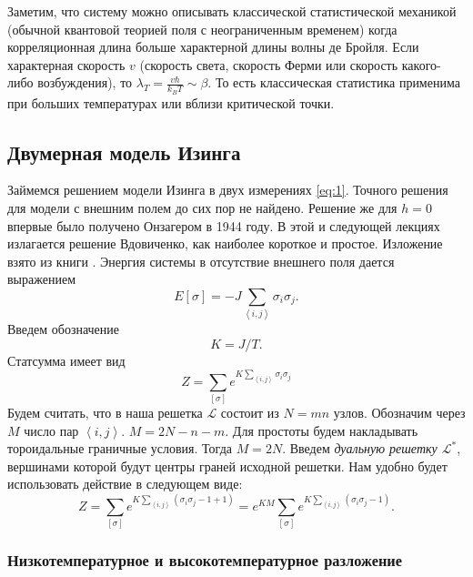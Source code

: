 \documentclass[a4paper,12pt]{article} \usepackage[utf8x]{inputenc} \usepackage[russian]{babel}
\theoremstyle{definition} \newtheorem{corollary}{Corollary}[theorem] \theoremstyle{definition}
\begin{document}
Заметим, что систему можно описывать классической статистической механикой (обычной квантовой
теорией поля с неограниченным временем) когда корреляционная длина больше характерной длины волны де
Бройля. Если характерная скорость $v$ (скорость света, скорость Ферми или скорость какого-либо
возбуждения), то $\lambda_T=\frac{v\hbar}{k_B T}\sim \beta$. То есть классическая статистика
применима при больших температурах или вблизи критической точки. %

\subsection{Двумерная модель Изинга}
\label{sec:ising2d}

Займемся решением модели Изинга в двух измерениях \eqref{eq:1}. Точного решения для модели с внешним
полем до сих пор не найдено. Решение же для $h=0$ впервые было получено Онзагером в 1944 году. В
этой и следующей лекциях излагается решение Вдовиченко, как наиболее короткое и простое. Изложение
взято из книги \cite{belavin2001lect}. Энергия системы в отсутствие внешнего поля дается выражением
\begin{equation}
  \label{eq:98} E[\sigma]=-J\sum_{\left<i,j\right>}\sigma_i \sigma_j .
\end{equation} Введем обозначение
\begin{equation}
  \label{eq:99} K=J/T.
\end{equation} Статсумма имеет вид
\begin{equation}
  \label{eq:100} Z=\sum_{[\sigma]}e^{K\sum_{\left<i,j\right>}\sigma_i\sigma_j}
\end{equation} Будем считать, что в наша решетка $\mathcal{L}$ состоит из $N=mn$ узлов. Обозначим
через $M$ число пар $\left<i,j\right>$. $M=2N-n-m$. Для простоты будем накладывать тороидальные
граничные условия. Тогда $M=2N$. Введем {\it дуальную решетку $\mathcal{L}^*$}, вершинами которой
будут центры граней исходной решетки. Нам удобно будет использовать действие в следующем виде:
\begin{equation}
  \label{eq:101} Z=\sum_{[\sigma]}e^{K\sum_{\left<i,j\right>}(\sigma_i\sigma_j-1+1)}=e^{KM}
\sum_{[\sigma]}e^{K\sum_{\left<i,j\right>}(\sigma_i\sigma_j-1)}.
\end{equation}

\subsubsection{Низкотемпературное и высокотемпературное разложение}
\label{sec:low-high-temp}
\end{document}
